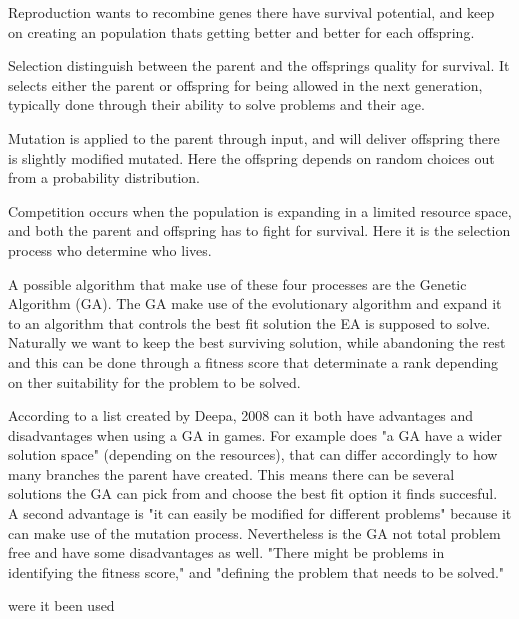 Reproduction wants to recombine  genes there have survival potential, and keep on creating an population thats getting better and better for each offspring. \cite{Fogel1997}

Selection distinguish between the parent and the offsprings quality for survival. It selects either the parent or offspring for being allowed in the next generation, typically done through their ability to solve problems and their age.   \cite{Smith2007}

Mutation is applied to the parent through input, and will deliver offspring there is slightly modified mutated. Here the offspring depends on random choices out from a probability distribution.  \cite{Smith2007}


Competition occurs when the population is expanding in a limited resource space, and both the parent and offspring has to fight for survival. Here it is the selection process who determine who lives. \cite{Fogel1997}



A possible algorithm that make use of these four processes are the Genetic Algorithm (GA). The GA make use of the evolutionary algorithm and expand it to an algorithm that controls the best fit solution the EA is supposed to solve. Naturally we want to keep the best surviving solution, while abandoning the rest and this can be done through a fitness score that determinate a rank depending on ther suitability for the problem to be solved. \cite {Sivanandam2008}

According to a list created by Deepa, 2008 can it both have advantages and disadvantages when using a GA in games.
For example does "a GA have a wider solution space" (depending on the resources), that can differ accordingly to how many branches the parent have created. This means there can be several solutions the GA can pick from and choose the best fit option it finds succesful.
A second advantage is "it can easily be modified for different problems" because it can make use of the mutation process.
Nevertheless is the GA not total problem free and have some disadvantages as well. "There might be problems in identifying the fitness score," and "defining the problem that needs to be solved."



were it been used





